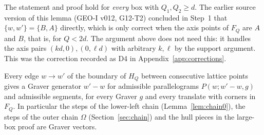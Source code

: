 \begin{remark}
The statement and proof hold for \emph{every} box with $Q_1,Q_2\ge d$. The earlier source version of this lemma (GEO-I v012, G12-T2) concluded in Step~1 that $\{w,w'\}=\{B,A\}$ directly, which is only correct when the axis points of $F_Q$ are $A$ and $B$, that is, for $Q<2d$. The argument above does not need this: it handles the axis pairs $(kd,0),(0,\ell d)$ with arbitrary $k,\ell$ by the support argument. This was the correction recorded as D4 in Appendix~\ref{app:corrections}.
\end{remark}

\begin{corollary}\label{cor:generators}
Every edge $w\to w'$ of the boundary of $H_Q$ between consecutive lattice points gives a Graver generator $w'-w$ for admissible parallelograms $P(w;w'-w,g)$ and admissible segments, for every Graver $g$ and every translate with corners in $F_Q$. In particular the steps of the lower-left chain (Lemma~\ref{lem:chain0}), the steps of the outer chain $\Omega$ (Section~\ref{sec:chain}) and the hull pieces in the large-box proof are Graver vectors.
\end{corollary}
